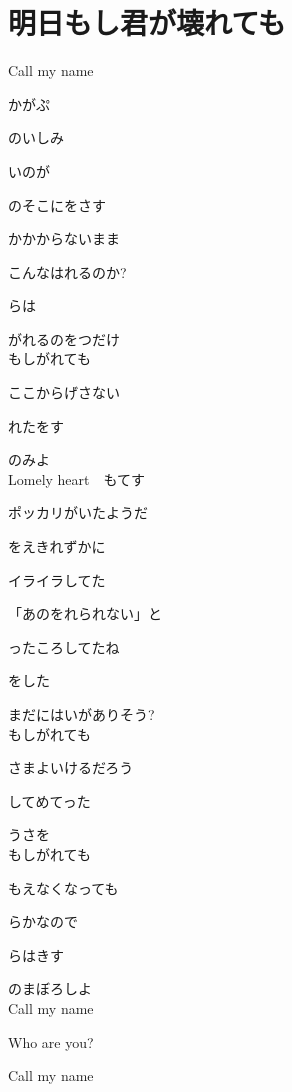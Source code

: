 \section{ 明日もし君が壊れても}
\large{

Call my name

かがぷ

のいしみ

いのが

のそこにをさす

かかからないまま

こんなはれるのか?

らは

がれるのをつだけ
\\

もしがれても

ここからげさない

れたをす

のみよ
\\

Lomely heart　もてす

ポッカリがいたようだ

をえきれずかに

イライラしてた

「あのをれられない」と

ったころしてたね

をした

まだにはいがありそう?
\\

もしがれても

さまよいけるだろう

してめてった

うさを
\\

もしがれても

もえなくなっても

らかなので

らはきす

のまぼろしよ
\\

Call my name

Who are you?

Call my name

}